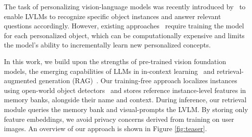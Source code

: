 
The task of personalizing vision-language models was recently introduced by~\cite{alaluf2024myvlm} to enable LVLMs to recognize specific object instances and answer relevant questions accordingly. However, existing approaches~\cite{alaluf2024myvlm,nguyen2024yo} require  training the model for each personalized object, which can be computationally expensive and limits the model's ability to incrementally learn new personalized concepts.


In this work, we build upon the strengths of pre-trained vision foundation models, the emerging capabilities of LLMs in in-context learning~\cite{dong2022surveyincontext} and retrieval-augmented generation (RAG)~\cite{lewis2020retrieval}. Our training-free approach localizes instances using open-world object detectors~\cite{liu2023grounding, kirillov2023segment, oquab2023dinov2} and stores reference instance-level features in memory banks, alongside their name and context. During inference, our retrieval module queries the memory bank and visual-prompts the LVLM. By storing only feature embeddings, we avoid privacy concerns derived from training on user images. An overview of our approach is shown in Figure \ref{fig:teaser}.

